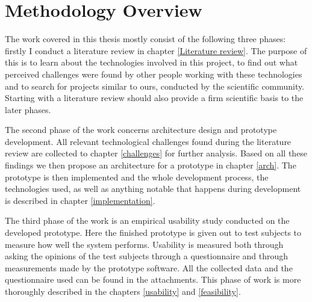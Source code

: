 \section{Methodology Overview} \label{meth}
The work covered in this thesis mostly consist of the following three phases: 
firstly I conduct a literature review in chapter \ref{Literature review}. The 
purpose of this is to learn about the technologies involved in this project, 
to find out what perceived challenges were found by other people working with 
these technologies and to search for projects similar to ours, conducted by the 
scientific community. Starting with a literature review should also provide a 
firm scientific basis to the later phases. \par
	The second phase of the work concerns architecture design and prototype 
development. All relevant technological challenges found during the literature 
review are collected to chapter \ref{challenges} for further analysis. Based 
on all these findings we then propose an architecture for a prototype in 
chapter \ref{arch}. The prototype is then implemented and the whole 
development process, the technologies used, as well as anything notable that 
happens during development is described in chapter \ref{implementation}. \par
	The third phase of the work is an empirical usability study conducted 
on the developed prototype. Here the finished prototype is given out to test 
subjects to measure how well the system performs. Usability is measured both 
through asking the opinions of the test subjects through a questionnaire and 
through measurements made by the prototype software. All the collected data and 
the questionnaire used can be found in the attachments. This phase of work is 
more thoroughly described in the chapters \ref{usability} and \ref{feasibility}.
